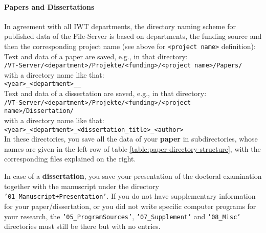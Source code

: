 \paragraph{Papers and Dissertations}

\noindent In agreement with all IWT departments, the directory naming scheme for
published data of the File-Server is based on departments, the funding source
and then the corresponding project name (see above for \texttt{<project name>}
definition):
\\
Text and data of a paper are saved, e.g., in that directory:  \\
\texttt{/VT-Server/<department>/Projekte/<funding>/<project name>/Papers/} \\
with a directory name like that:
\\
\texttt{<year>\_<department>\_<paper-name>\_<first author>} \\
Text and data of a dissertation are saved, e.g., in that directory:
\\
\texttt{/VT-Server/<department>/Projekte/<funding>/<project name>/Dissertation/} \\
with a directory name like that:
\\
\texttt{<year>\_<department>\_<dissertation\_title>\_<author>} \\
In these directories, you save all the data of your \textbf{paper} in
subdirectories, whose names are given in the left row of table
\ref{table:paper-directory-structure}, with the corresponding
files explained on the right.
\begin{table}[!h]
  \caption{%
  The data of every paper has to be saved in eight subdirectories;
  further remarks: \\
  **When the paper is ready for press the corresponding author loads the last and
  revised version (i.e. only the real used but absolutely complete data) into
  the protected directory \\
  ***If the data reproduced in a figure/table is from distributed primary data
  directories, it is sufficient to save here only the generating program%
  }

\label{table:paper-directory-structure}
\end{table}

In case of a \textbf{dissertation}, you save your presentation of the doctoral
examination together with the manuscript under the directory
\texttt{'01\_Manuscript+Presentation'}. If you do not have supplementary
information for your paper/dissertation, or you did not write specific computer
programs for your research, the \texttt{'05\_ProgramSources'},
\texttt{'07\_Supplement'} and \texttt{'08\_Misc'} directories must still be
there but with no entries.

